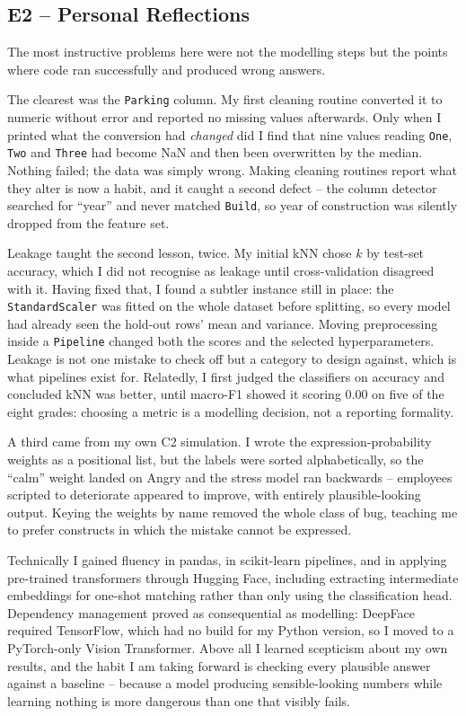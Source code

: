 \documentclass[11pt,a4paper]{article}
\begin{document}
\subsection{E2 -- Personal Reflections}

The most instructive problems here were not the modelling steps but the points where code ran
successfully and produced wrong answers.

The clearest was the \texttt{Parking} column. My first cleaning routine converted it to numeric
without error and reported no missing values afterwards. Only when I printed what the
conversion had \emph{changed} did I find that nine values reading \texttt{One}, \texttt{Two}
and \texttt{Three} had become NaN and then been overwritten by the median. Nothing failed; the
data was simply wrong. Making cleaning routines report what they alter is now a habit, and it
caught a second defect -- the column detector searched for ``year'' and never matched
\texttt{Build}, so year of construction was silently dropped from the feature set.

Leakage taught the second lesson, twice. My initial kNN chose $k$ by test-set accuracy, which I
did not recognise as leakage until cross-validation disagreed with it. Having fixed that, I
found a subtler instance still in place: the \texttt{StandardScaler} was fitted on the whole
dataset before splitting, so every model had already seen the hold-out rows' mean and variance.
Moving preprocessing inside a \texttt{Pipeline} changed both the scores and the selected
hyperparameters. Leakage is not one mistake to check off but a category to design against, which
is what pipelines exist for. Relatedly, I first judged the classifiers on accuracy and concluded
kNN was better, until macro-F1 showed it scoring 0.00 on five of the eight grades: choosing a
metric is a modelling decision, not a reporting formality.

A third came from my own C2 simulation. I wrote the expression-probability weights as a
positional list, but the labels were sorted alphabetically, so the ``calm'' weight landed on
Angry and the stress model ran backwards -- employees scripted to deteriorate appeared to
improve, with entirely plausible-looking output. Keying the weights by name removed the whole
class of bug, teaching me to prefer constructs in which the mistake cannot be expressed.

Technically I gained fluency in pandas, in scikit-learn pipelines, and in applying pre-trained
transformers through Hugging Face, including extracting intermediate embeddings for one-shot
matching rather than only using the classification head. Dependency management proved as
consequential as modelling: DeepFace required TensorFlow, which had no build for my Python
version, so I moved to a PyTorch-only Vision Transformer. Above all I learned scepticism about
my own results, and the habit I am taking forward is checking every plausible answer against a
baseline -- because a model producing sensible-looking numbers while learning nothing is more
dangerous than one that visibly fails.
\end{document}

